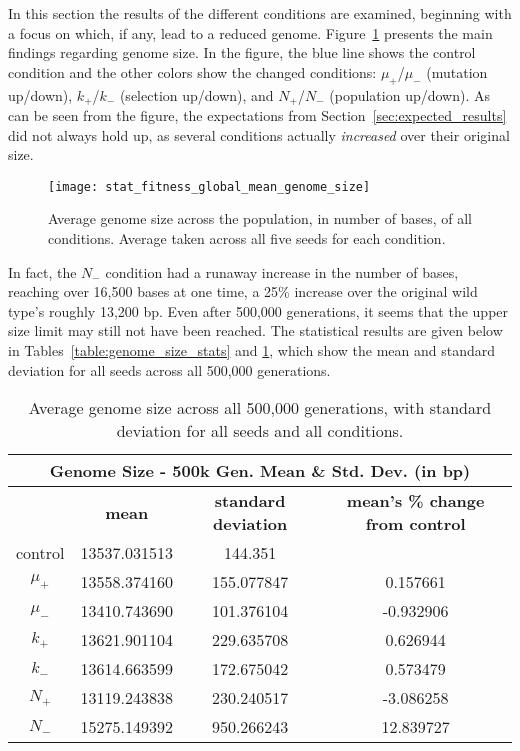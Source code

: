 In this section the results of the different conditions are examined, beginning with a focus on which, if any, lead to a reduced genome. Figure~\ref{fig:genome_size} presents the main findings regarding genome size. In the figure, the blue line shows the control condition and the other colors show the changed conditions: $\mu_+$/$\mu_-$ (mutation up/down), $k_+$/$k_-$ (selection up/down), and $N_+$/$N_-$ (population up/down). As can be seen from the figure, the expectations from Section~\ref{sec:expected_results} did not always hold up, as several conditions actually \textit{increased} over their original size. 
\begin{figure}[H]
	\centering
	\texttt{[image: stat\_fitness\_global\_mean\_genome\_size]}
	\caption[Genome size]{Average genome size across the population, in number of bases, of all conditions. Average taken across all five seeds for each condition.}
	\label{fig:genome_size}
\end{figure}
In fact, the $N_-$ condition had a runaway increase in the number of bases, reaching over 16,500 bases at one time, a 25\% increase over the original wild type's roughly 13,200 bp. Even after 500,000 generations, it seems that the upper size limit may still not have been reached. The statistical results are given below in Tables~\ref{table:genome_size_stats} and \ref{table:genome_size_mean_and_std_dev}, which show the mean and standard deviation for all seeds across all 500,000 generations. 

\begin{table}[H]
	\begin{tabular}{|c|c|c|c|}
		\hline
		\multicolumn{4}{c}{\Large \textbf{Genome Size - 500k Gen. Mean \& Std. Dev. (in bp)}} \\
		\hline
		 & \textbf{mean} & \textbf{standard deviation} & \textbf{mean's \% change from control} \\
		 \hline
		 control & 13537.031513 & 144.351 & \textemdash \\ 
		 \hline
		 $\mu_+$ & 13558.374160 & 155.077847 & 0.157661 \\ 
		 \hline
		 $\mu_-$ & 13410.743690 & 101.376104 & -0.932906 \\ 
		 \hline
		 $k_+$ & 13621.901104 & 229.635708 & 0.626944 \\ 
		 \hline
		 $k_-$ & 13614.663599 & 172.675042 & 0.573479 \\ 
		 \hline
		 $N_+$ & 13119.243838 & 230.240517 & -3.086258 \\ 
		 \hline
		 $N_-$ & 15275.149392 & 950.266243 & 12.839727 \\ 
		 \hline
	\end{tabular}
	\caption[Genome size - mean and std. dev.]{Average genome size across all 500,000 generations, with standard deviation for all seeds and all conditions. }
	\label{table:genome_size_mean_and_std_dev}
\end{table}

